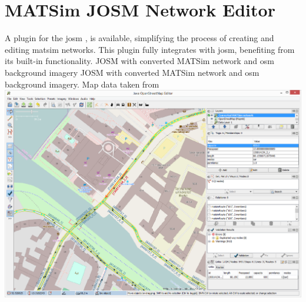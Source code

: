 \section{MATSim JOSM Network Editor}
A plugin for the \gls{josm} \citep[][]{JOSM2014}, is available, simplifying the process of creating and editing \gls{matsim} networks. This plugin fully integrates with \gls{josm}, benefiting from its built-in functionality.
%
\createfigure
{JOSM with converted MATSim network and \protect\gls{osm} background imagery}
{JOSM with converted MATSim network and \protect\gls{osm} background imagery. Map data taken from \citet[][]{OpenStreetMap2014}}
{\label{fig:networkeditor_screenshot}}
{\includegraphics[width=1.0\textwidth]{extending/figures/networkeditor/josm_screenshot}}
{}

